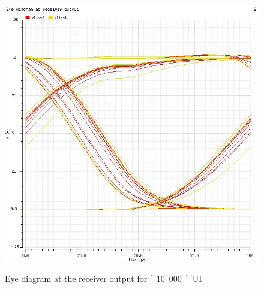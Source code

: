 \begin{figure}[H]
  \centering
  {\includegraphics[scale=0.8]{img/rx_out_eye.jpg}}
  \caption{Eye diagram at the receiver output for \unit[10.000]{UI}}
  \label{fig:rx_out_eye}
\end{figure}